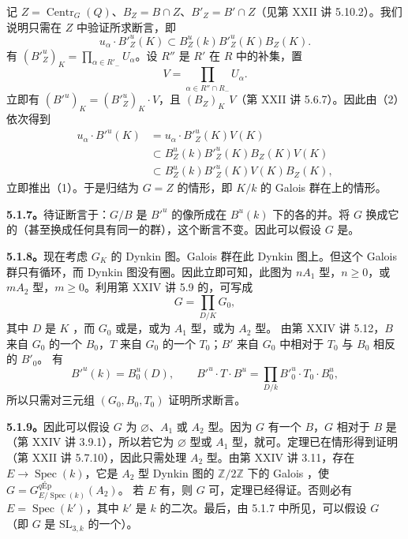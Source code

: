 记 $Z=\operatorname{Centr}_G(Q)$、$B_Z=B\cap Z$、$B'_Z=B'\cap Z$（见第 XXII 讲 5.10.2）。我们说明只需在 $Z$ 中验证所求断言，即
\[
 u_\alpha\cdot B'^u_Z(K)\subset B^u_Z(k)B'^u_Z(K)B_Z(K).\tag{2}
\]
有 $(B'^u_Z)_K=\prod_{\alpha\in R'_-}U_\alpha$。设 $R''$ 是 $R'$ 在 $R$ 中的补集，置
\[
 V=\prod_{\alpha\in R''\cap R_-}U_\alpha.
\]
立即有 $(B'^u)_K=(B'^u_Z)_K\cdot V$，且 $(B_Z)_K$  $V$（第 XXII 讲 5.6.7）。因此由（2）依次得到
\begin{align*}
 u_\alpha\cdot B'^u(K)
 &=u_\alpha\cdot B'^u_Z(K)V(K)\\
 &\subset B^u_Z(k)B'^u_Z(K)B_Z(K)V(K)\\
 &\subset B^u_Z(k)B'^u_Z(K)V(K)B_Z(K),
\end{align*}
立即推出（1）。于是归结为 $G=Z$ 的情形，即 $K/k$ 的 Galois 群在上的情形。

\textbf{5.1.7。}待证断言于：$G/B$ 是 $B'^u$ 的像所成在 $B^u(k)$ 下的各的并。将 $G$ 换成它的（甚至换成任何具有同一的群），这个断言不变。因此可以假设 $G$ 是。

\textbf{5.1.8。}现在考虑 $G_K$ 的 Dynkin 图。Galois 群在此 Dynkin 图上。但这个 Galois 群只有循环，而 Dynkin 图没有圈。因此立即可知，此图为 $nA_1$ 型，$n\geq0$，或 $mA_2$ 型，$m\geq0$。利用第 XXIV 讲 5.9 的，可写成
\[
 G=\prod_{D/K}G_0,
\]
其中 $D$ 是 $K$ ，而 $G_0$ 或是，或为 $A_1$ 型，或为 $A_2$ 型。
由第 XXIV 讲 5.12，$B$ 来自 $G_0$ 的一个 $B_0$，$T$ 来自 $G_0$ 的一个 $T_0$；$B'$ 来自 $G_0$ 中相对于 $T_0$ 与 $B_0$ 相反的 $B'_0$。
有
\[
 B'^u(k)=B_0^u(D),\qquad
 B'^u\cdot T\cdot B^u=\prod_{D/k}B'^u_0\cdot T_0\cdot B^u_0,
\]
所以只需对三元组 $(G_0,B_0,T_0)$ 证明所求断言。

\textbf{5.1.9。}因此可以假设 $G$ 为 $\varnothing$、$A_1$ 或 $A_2$ 型。因为 $G$ 有一个 $B$，$G$ 相对于 $B$ 是（第 XXIV 讲 3.9.1），所以若它为 $\varnothing$ 型或 $A_1$ 型，就可。定理已在情形得到证明（第 XXII 讲 5.7.10），因此只需处理 $A_2$ 型。由第 XXIV 讲 3.11，存在 $E\to\operatorname{Spec}(k)$，它是 $A_2$ 型 Dynkin 图的 $\mathbb Z/2\mathbb Z$ 下的 Galois ，使
$G=G^{q\mathrm{\text{É}p}}_{E/\operatorname{Spec}(k)}(A_2)$。
若 $E$ 有，则 $G$ 可，定理已经得证。否则必有 $E=\operatorname{Spec}(k')$，其中 $k'$ 是 $k$ 的二次。最后，由 5.1.7 中所见，可以假设 $G$ （即 $G$ 是 $\mathrm{SL}_{3,k}$ 的一个）。


